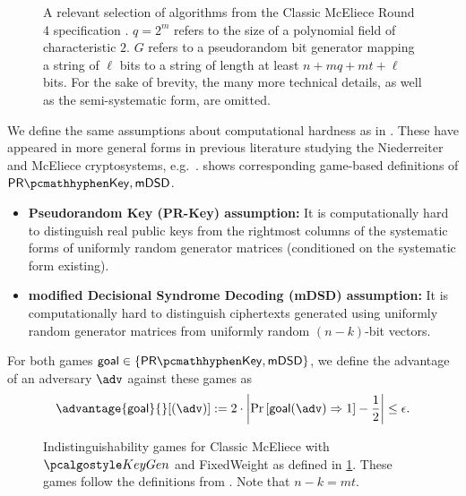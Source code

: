 \begin{figure}
    
    \caption[
        A selection of algorithms from the Classic McEliece Round 4 specification.
    ]{
        A relevant selection of algorithms from the Classic McEliece Round 4 specification \cite{NISTPQC-R4:ClassicMcEliece22}. $q=2^m$ refers to the size of a polynomial field of characteristic $2$. $G$ refers to a pseudorandom bit generator mapping a string of $\ell$ bits to a string of length at least $n + mq + mt + \ell$ bits. For the sake of brevity, the many more technical details, as well as the semi-systematic form, are omitted.}
    \label{fig:classic-mceliece-spec}
\end{figure}

We define the same assumptions about computational hardness as in \cite[Definition~K.1]{EC:Xagawa22}. These have appeared in more general forms in previous literature studying the Niederreiter and McEliece cryptosystems, e.g.~\cite{AC:CouFinSen01,EC:SaiXagYam18}.  shows corresponding game-based definitions of $\prkey, \mdsd$.
\begin{itemize}
    \item \textbf{Pseudorandom Key (PR-Key) assumption:} It is computationally hard to distinguish real public keys from the rightmost columns of the systematic forms of uniformly random generator matrices (conditioned on the systematic form existing).
    \item \textbf{modified Decisional Syndrome Decoding (mDSD) assumption:} It is computationally hard to distinguish ciphertexts generated using uniformly random generator matrices from uniformly random $(n-k)$-bit vectors.
\end{itemize}

For both games $\mathsf{goal} \in \{\prkey, \mdsd\}$, we define the advantage of an adversary $\adv$ against these games as
\[
    \advantage{\mathsf{goal}}{}[(\adv)]
    := 2 \cdot \left| \Pr\left[\mathsf{goal}(\adv) \Rightarrow 1\right] - \frac{1}{2} \right|
    \leq \epsilon.
\]

\begin{figure}
    
    \caption[
        Indistinguishability games for Classic McEliece.
    ]{
        Indistinguishability games for Classic McEliece with $\kgen$ and \textsf{FixedWeight} as defined in \cref{fig:classic-mceliece-spec}. These games follow the definitions from \cite[Definition~K.1]{EC:Xagawa22}. Note that $n-k = mt$.}
    \label{fig:classic-mceliece-assumptions}
\end{figure}

